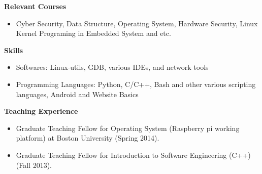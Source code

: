\documentclass[]{article}
\begin{document}
\noindent \textbf{Relevant Courses}
\begin{itemize}
\item 
Cyber Security, Data Structure, Operating System, Hardware Security, Linux Kernel Programing in Embedded System and etc.
\end{itemize}


\noindent \textbf{Skills}
\begin{itemize}
\item Softwares: Linux-utils, GDB, various IDEs, and network tools
\item Programming Languages:  Python, C/C++, Bash and other various scripting languages,
Android and Website Basics
\end{itemize}
\noindent \textbf{Teaching Experience}
\begin{itemize}
\item Graduate Teaching Fellow for Operating System (Raspberry pi working
platform) at Boston University (Spring 2014).
\item Graduate Teaching Fellow for Introduction to Software Engineering (C++)
(Fall 2013).
\end{itemize}
\end{document}
